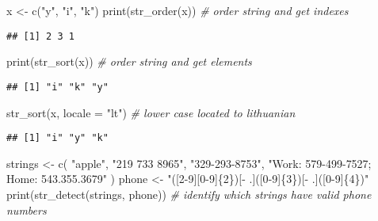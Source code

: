 \documentclass[
]{article}
\newenvironment{Shaded}{\begin{snugshade}}{\end{snugshade}}
\newcommand{\AttributeTok}[1]{\textcolor[rgb]{0.77,0.63,0.00}{#1}}
\newcommand{\CommentTok}[1]{\textcolor[rgb]{0.56,0.35,0.01}{\textit{#1}}}
\newcommand{\FunctionTok}[1]{\textcolor[rgb]{0.00,0.00,0.00}{#1}}
\newcommand{\NormalTok}[1]{#1}
\newcommand{\OtherTok}[1]{\textcolor[rgb]{0.56,0.35,0.01}{#1}}
\newcommand{\StringTok}[1]{\textcolor[rgb]{0.31,0.60,0.02}{#1}}
\begin{document}
\begin{Shaded}
\begin{Highlighting}[]
\NormalTok{x }\OtherTok{\textless{}{-}} \FunctionTok{c}\NormalTok{(}\StringTok{"y"}\NormalTok{, }\StringTok{"i"}\NormalTok{, }\StringTok{"k"}\NormalTok{)}
\FunctionTok{print}\NormalTok{(}\FunctionTok{str\_order}\NormalTok{(x)) }\CommentTok{\# order string and get indexes}
\end{Highlighting}
\end{Shaded}

\begin{verbatim}
## [1] 2 3 1
\end{verbatim}

\begin{Shaded}
\begin{Highlighting}[]
\FunctionTok{print}\NormalTok{(}\FunctionTok{str\_sort}\NormalTok{(x)) }\CommentTok{\# order string and get elements}
\end{Highlighting}
\end{Shaded}

\begin{verbatim}
## [1] "i" "k" "y"
\end{verbatim}

\begin{Shaded}
\begin{Highlighting}[]
\FunctionTok{str\_sort}\NormalTok{(x, }\AttributeTok{locale =} \StringTok{"lt"}\NormalTok{) }\CommentTok{\# lower case located to lithuanian}
\end{Highlighting}
\end{Shaded}

\begin{verbatim}
## [1] "i" "y" "k"
\end{verbatim}

\begin{Shaded}
\begin{Highlighting}[]
\NormalTok{strings }\OtherTok{\textless{}{-}} \FunctionTok{c}\NormalTok{(}
  \StringTok{"apple"}\NormalTok{, }
  \StringTok{"219 733 8965"}\NormalTok{, }
  \StringTok{"329{-}293{-}8753"}\NormalTok{, }
  \StringTok{"Work: 579{-}499{-}7527; Home: 543.355.3679"}
\NormalTok{)}
\NormalTok{phone }\OtherTok{\textless{}{-}} \StringTok{"([2{-}9][0{-}9]\{2\})[{-} .]([0{-}9]\{3\})[{-} .]([0{-}9]\{4\})"}
\FunctionTok{print}\NormalTok{(}\FunctionTok{str\_detect}\NormalTok{(strings, phone)) }\CommentTok{\# identify which strings have valid phone numbers}
\end{Highlighting}
\end{Shaded}
\end{document}
